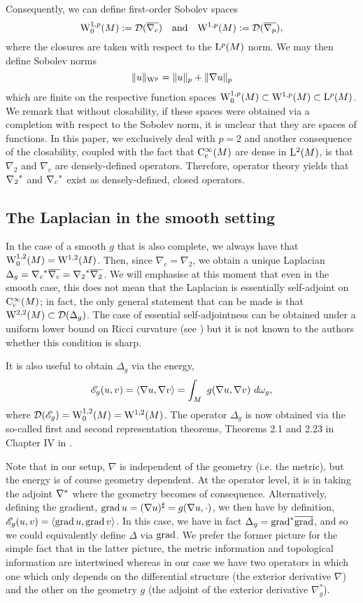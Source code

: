 \documentclass[a4paper, 12pt]{amsart}
\begin{document}
Consequently, we can define first-order Sobolev spaces
\[
\Sob[0]{1,p}(M) := \dom(\overline{\nabla_c})\quad \text{and}\quad  \Sob{1,p}(M) := \dom(\overline{\nabla_p}),
\]
where the closures are taken with respect to the \(\Lp{p}(M)\) norm. We may then define Sobolev norms
\[
\|u\|_{\Sob{p}} = \|u\|_p + \|\nabla u\|_p
\]
which are finite on the respective function spaces $\Sob[0]{1,p}(M) \subset \Sob{1,p}(M) \subset \Lp{p}(M)$. We remark that without closability, if these spaces were obtained via a completion with respect to the Sobolev norm, it is unclear that they are spaces of functions. In this paper, we exclusively deal with \(p = 2\) and another consequence of the closability, coupled with the 
fact that $\Ck[c]{\infty}(M)$ are dense in $\Lp{2}(M)$,
is that $\nabla_2$ and $\nabla_c$ are densely-defined
operators. Therefore, operator theory yields 
that $\adj{\nabla_2}$ and $\adj{\nabla_c}$ exist
as densely-defined, closed operators.

\subsection{The Laplacian in the smooth setting}

In the case of a smooth $g$ that is also complete, we
always have that $\SobH[0]{1}(M) = \SobH{1}(M)$. 
Then, since $\nabla_c = \nabla_2$, we obtain 
a unique Laplacian $\Delta_g = \adj{\nabla_c} \close{\nabla_c} = \adj{\nabla_2}\close{\nabla_2}$.
We will emphasise at this moment that even in the smooth case, this does not mean that the Laplacian is essentially self-adjoint on $\Ck[c]{\infty}(M)$; in fact, the only general statement that can be made is that
$\SobH{2}(M) \subset \dom(\Delta_g)$. The 
case of essential self-adjointness can
be obtained under a uniform lower bound on Ricci
curvature (see \cite{BDensity}) but it
is not known to the authors whether this condition is sharp.

It is also useful to obtain $\Delta_g$ via the energy,
$$\sE_g(u,v) = \inprod{\nabla u, \nabla v} = \int_M\ g(\nabla u, \nabla v)\ d\omega_g,$$
where $\dom(\sE_g) = \SobH[0]{1}(M) = \SobH{1}(M)$.
The operator $\Delta_g$ is now obtained via the so-called first and second representation 
theorems, Theorems 2.1 and 2.23 in Chapter IV  in \cite{Kato}.
 
Note that in our setup, $\nabla$ is independent of the geometry (i.e. the metric), but the energy is of course geometry dependent. At the operator level, it is in taking the adjoint $\adj{\nabla}$ where the geometry becomes of consequence. Alternatively, defining the gradient, $\grad u =  (\nabla u)^\sharp = g(\nabla u, \cdot)$, we then have by definition, $\sE_g(u,v) = \inprod{\grad u, \grad v}$. In this case, we have in fact $\Delta_g = \adj{\grad} \close{\grad}$, and so we could equivalently define \(\Delta\) via \(\grad\). We prefer the former picture for the simple fact that in the latter picture, the metric information and topological information are intertwined whereas in our case we have two operators in which one which only depends on the differential structure (the exterior derivative $\nabla$) and the other on the geometry $g$ (the adjoint of the exterior derivative $\nabla^\ast_g$).
\end{document}
